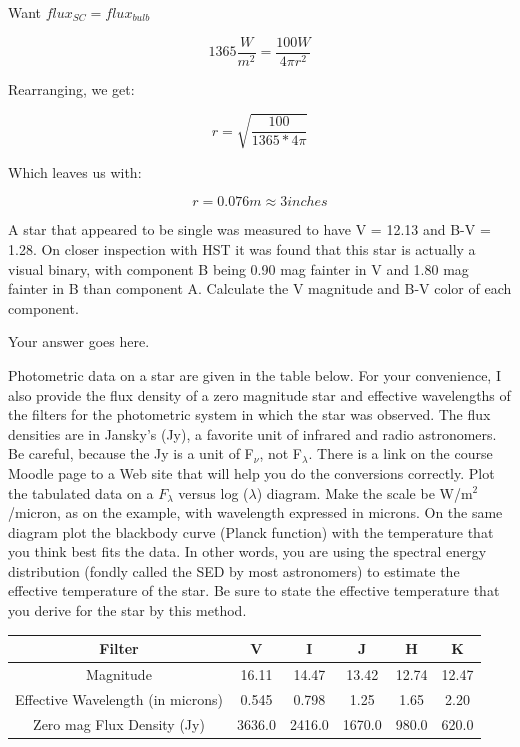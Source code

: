 \documentclass[12pt]{article}
\newenvironment{problem}[2][Problem]{\begin{trivlist}
\item[\hskip \labelsep {\bfseries #1}\hskip \labelsep {\bfseries #2.}]}{\end{trivlist}}
\newenvironment{answer}[2][Answer]{\begin{trivlist}
\item[\hskip \labelsep {\bfseries #1}\hskip \labelsep {\bfseries #2.}]}{\end{trivlist}}
\begin{document}
\begin{answer}{1}

  Want $flux_{SC} = flux_{bulb}$

  $$ 1365 \frac{W}{m^{2}} = \frac{100 W}{4 \pi r^{2}}  $$

  Rearranging, we get:

  $$ r = \sqrt{ \frac{100}{1365 * 4 \pi}} $$

  Which leaves us with:

  $$ r = 0.076 m \approx 3 inches $$



\begin{problem}{2}
A star that appeared to be single was measured to have V = 12.13 and B-V = 1.28. On closer inspection with HST it was found that this star is actually a visual binary, with component B being 0.90 mag fainter in V and 1.80 mag fainter in B than component A. Calculate the V magnitude and B-V color of each component.
\end{problem}

\begin{answer}{2}
Your answer goes here.
\end{answer}

\begin{problem}{3}
Photometric data on a star are given in the table below. For your convenience, I also provide the flux density of a zero magnitude star and effective wavelengths of the filters for the photometric system in which the star was observed. The flux densities are in Jansky's (Jy), a favorite unit of infrared and radio astronomers. Be careful, because the Jy is a unit of F$_\nu$, not F$_\lambda$. There is a link on the course Moodle page to a Web site that will help you do the conversions correctly. Plot the tabulated data on a $F_\lambda$ versus log ($\lambda$) diagram. Make the scale be W/m$^2$/micron, as on the example, with wavelength expressed in microns. On the same diagram plot the blackbody curve (Planck function) with the temperature that you think best fits the data. In other words, you are using the spectral energy distribution (fondly called the SED by most astronomers) to estimate the effective temperature of the star. Be sure to state the effective temperature that you derive for the star by this method.
\bigskip
\smallskip

\begin{tabular} {cccccc}

Filter & V & I & J & H & K \\
\hline
\hline
Magnitude & 16.11 & 14.47 & 13.42 & 12.74 & 12.47 \\
Effective Wavelength (in microns) & 0.545 & 0.798 & 1.25 & 1.65 & 2.20 \\
Zero mag Flux Density (Jy) & 3636.0 & 2416.0 & 1670.0 & 980.0 & 620.0 \\
\hline


\end{tabular}
\end{problem}
\end{answer}
\end{document}

